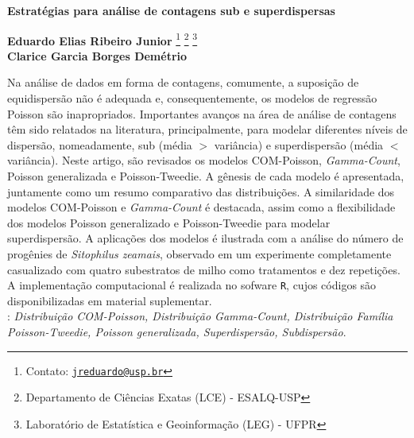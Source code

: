 \documentclass[12pt, a4paper]{article}
\begin{document}
\onehalfspacing

\begin{center}
  \textbf{
    \Large{Estratégias para análise de contagens sub e
      superdispersas}} \\[1em]
\end{center}

\begin{flushright}
  {\bf Eduardo Elias Ribeiro Junior}
  \footnote[$\dagger$]{Contato:
    \href{mailto:jreduardo@usp.br}{\tt jreduardo@usp.br}}
  \footnote[1]{Departamento de Ciências Exatas (LCE) - ESALQ-USP}
  \footnote[2]{Laboratório de Estatística e Geoinformação (LEG) -
    UFPR}\\
  {\bf Clarice Garcia Borges Demétrio} \footnotemark[1]
\end{flushright}

\vspace*{0.5cm}

\noindent Na análise de dados em forma de contagens, comumente, a
suposição de equidispersão não é adequada e, consequentemente, os
modelos de regressão Poisson são inapropriados. Importantes avanços na
área de análise de contagens têm sido relatados na literatura,
principalmente, para modelar diferentes níveis de dispersão,
nomeadamente, sub (média $>$ variância) e superdispersão (média $<$
variância). Neste artigo, são revisados os modelos COM-Poisson,
\textit{Gamma-Count}, Poisson generalizada e Poisson-Tweedie. A gênesis
de cada modelo é apresentada, juntamente como um resumo comparativo das
distribuições. A similaridade dos modelos COM-Poisson e
\textit{Gamma-Count} é destacada, assim como a flexibilidade dos modelos
Poisson generalizado e Poisson-Tweedie para modelar superdispersão. A
aplicações dos modelos é ilustrada com a análise do número de progênies
de \textit{Sitophilus zeamais}, observado em um experimente completamente
casualizado com quatro subestratos de milho como tratamentos e dez
repetições. A implementação computacional é realizada no sofware
\texttt{R}, cujos códigos são disponibilizadas em material
suplementar.\\

:
{\it Distribuição COM-Poisson, Distribuição Gamma-Count, Distribuição
  Família Poisson-Tweedie, Poisson generalizada, Superdispersão,
  Subdispersão}.\\
\end{document}
